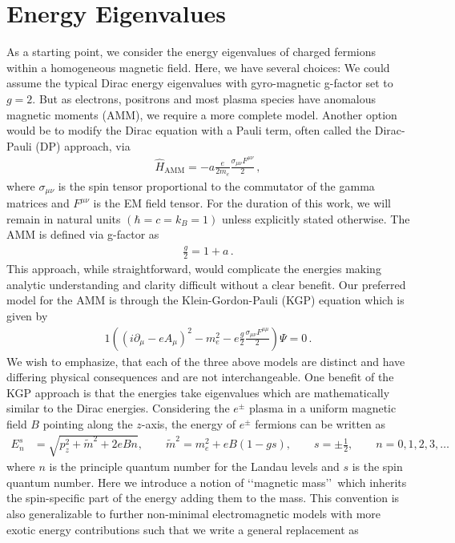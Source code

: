 \documentclass[Universe,article,submit,moreauthors,pdftex]{Definitions/mdpi}
\begin{document}
\section{Energy Eigenvalues}\label{sec:energy}
\noindent As a starting point, we consider the energy eigenvalues of charged fermions within a homogeneous magnetic field. Here, we have several choices: We could assume the typical Dirac energy eigenvalues with gyro-magnetic g-factor set to $g=2$. But as electrons, positrons and most plasma species have anomalous magnetic moments (AMM), we require a more complete model. Another option would be to modify the Dirac equation with a Pauli term, often called the Dirac-Pauli (DP) approach, via
\begin{align}
  \label{Pauli} \hat{H}_{\mathrm{AMM}} = -a\frac{e}{2m_{e}}\frac{\sigma_{\mu\nu}F^{\mu\nu}}{2}\,,
\end{align}
where $\sigma_{\mu\nu}$ is the spin tensor proportional to the commutator of the gamma matrices and $F^{\mu\nu}$ is the EM field tensor. For the duration of this work, we will remain in natural units $(\hbar=c=k_{B}=1)$ unless explicitly stated otherwise. The AMM is defined via g-factor as
\begin{align}
  \label{AMM} \frac{g}{2}=1+a\,.
\end{align}
This approach, while straightforward, would complicate the energies making analytic understanding and clarity difficult without a clear benefit. Our preferred model for the AMM is through the Klein-Gordon-Pauli (KGP) equation which is given by
\begin{alignat}{1}
  \label{KGP} \left(\left(i\partial_{\mu}-eA_{\mu}\right)^{2}-m_{e}^{2}-e\frac{g}{2}\frac{\sigma_{\mu\nu}F^{\mu\mu}}{2}\right)\Psi=0\,.
\end{alignat}
We wish to emphasize, that each of the three above models are distinct and have differing physical consequences and are not interchangeable. One benefit of the KGP approach is that the energies take eigenvalues which are mathematically similar to the Dirac energies. Considering the $e^\pm$ plasma in a uniform magnetic field $B$ pointing along the $z$-axis, the energy of $e^\pm$ fermions can be written as
\begin{align}
  \label{KGPEnergy} E_{n}^{s}&=\sqrt{p^2_z+\tilde{m}^2+2eBn},\qquad\tilde{m}^2=m^2_e+eB\left(1-gs\right),\qquad s=\pm\frac{1}{2},\qquad n=0,1,2,3,\dots
\end{align}
where $n$ is the principle quantum number for the Landau levels and $s$ is the spin quantum number. Here we introduce a notion of \lq\lq magnetic mass\rq\rq\ which inherits the spin-specific part of the energy adding them to the mass. This convention is also generalizable to further non-minimal electromagnetic models with more exotic energy contributions such that we write a general replacement as
\end{document}
